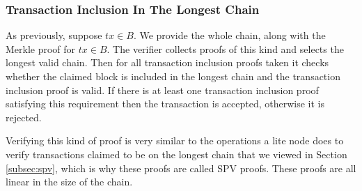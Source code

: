 \subsubsection{Transaction Inclusion In The Longest Chain}
As previously, suppose $tx \in B$. We provide the whole chain, along with the Merkle proof for $tx \in B$. The verifier collects proofs of this kind and selects the longest valid chain. Then for all transaction inclusion proofs taken it checks whether the claimed block is included in the longest chain and the transaction inclusion proof is valid. If there is at least one transaction inclusion proof satisfying this requirement then the transaction is accepted, otherwise it is rejected.

Verifying this kind of proof is very similar to the operations a lite node does to verify transactions claimed to be on the longest chain that we viewed in Section \ref{subsec:spv}, which is why these proofs are called SPV proofs. These proofs are all linear in the size of the chain.
